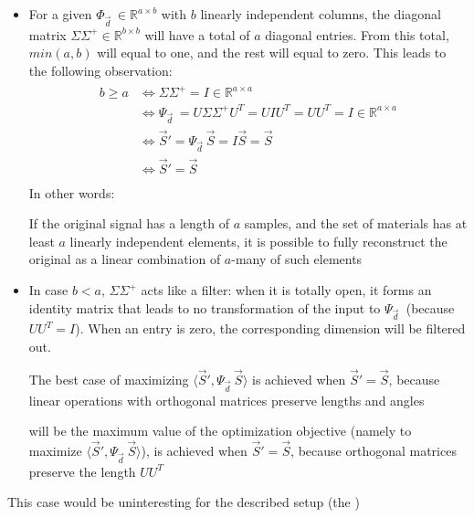 \documentclass[11pt]{scrartcl} %
\begin{document}
  \begin{itemize}
  \item For a given \( \Phi_{\vec{d}\;}\in\mathbb{R}^{a\times b}\) with \(b\) linearly independent columns, the diagonal matrix \(\Sigma \Sigma^+\in\mathbb{R}^{b\times b}\) will have a total of \(a\) diagonal entries. From this total, \(min(a,b)\) will equal to one, and the rest will equal to zero. This leads to the following observation:
    \begin{align*}
      \begin{aligned}
        b\geq a &\iff \Sigma \Sigma^+ = I\in\mathbb{R}^{a\times a}\\
        &\iff \Psi_{\vec{d}\;} = U\Sigma \Sigma^+ U^T = UIU^T = UU^T = I\in\mathbb{R}^{a\times a}\\
        &\iff \vec{S}' = \Psi_{\vec{d}\;}\vec{S} = I\vec{S} = \vec{S}\\
        &\iff \vec{S}' = \vec{S}\\
        \end{aligned}
    \end{align*}
    In other words:
    \begin{tcolorbox}
      If the original signal has a length of \(a\) samples, and the set of materials has at least \(a\) linearly independent elements, it is possible to fully reconstruct the original as a linear combination of \(a\)-many of such elements
    \end{tcolorbox}
  \item In case \(b<a\), \(\Sigma\Sigma^+\) acts like a filter: when it is totally open, it forms an identity matrix that leads to no transformation of the input to \( \Psi_{\vec{d}\;}\) (because \(UU^T=I\)). When an entry is zero, the corresponding dimension will be filtered out.
    \begin{tcolorbox}
      The best case of maximizing \(\langle \vec{S}', \Psi_{\vec{d}\;}\vec{S} \rangle\) is achieved when \(\vec{S}' = \vec{S}\), because linear operations with orthogonal matrices preserve lengths and angles
    \end{tcolorbox}


    will be  the maximum value of the optimization objective (namely to maximize \(\langle \vec{S}', \Psi_{\vec{d}\;}\vec{S} \rangle\)), is achieved when \(\vec{S}' = \vec{S}\), because orthogonal matrices preserve the length \(UU^T\)
  \end{itemize}
  This case would be uninteresting for the described setup (the )
\end{document}
